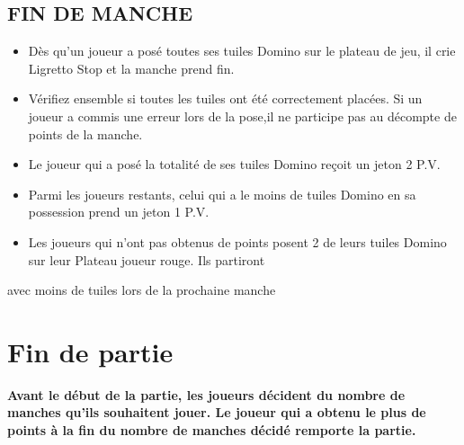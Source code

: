 \documentclass{article}%
\begin{document}
\subsection{ FIN DE MANCHE
}%
\label{subsec:FINDEMANCHE}%
\begin{itemize}%
\item%
%
 Dès qu’un joueur a posé toutes ses tuiles Domino sur le plateau de jeu, il crie Ligretto Stop et la manche prend fin.
%
\item%
%
 Vérifiez ensemble si toutes les tuiles ont été correctement placées. Si un joueur a commis une erreur lors de la pose,il ne participe pas au décompte de points de la manche.
%
\item%
%
 Le joueur qui a posé la totalité de ses tuiles Domino reçoit un jeton 2 P.V.
%
\item%
%
 Parmi les joueurs restants, celui qui a le moins de tuiles Domino en sa possession prend un jeton 1 P.V.
%
\item%
%
 Les joueurs qui n'ont pas obtenus de points posent 2 de leurs tuiles Domino sur leur Plateau joueur rouge. Ils partiront
%
\end{itemize}%
avec moins de tuiles lors de la prochaine manche


%
\section{ Fin de partie
}%
\label{sec:Findepartie}%
\textbf{Avant le début de la partie, les joueurs décident du nombre de manches qu’ils souhaitent jouer. Le joueur qui a obtenu le plus de points à la fin du nombre de manches décidé remporte la partie.}

%
\end{document}
